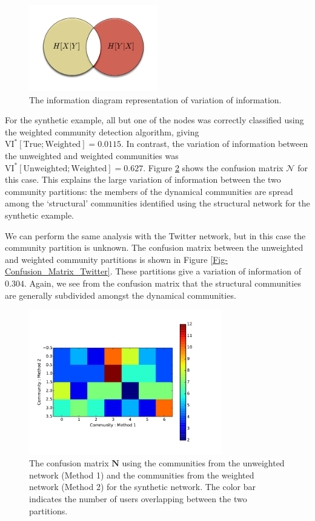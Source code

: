 \documentclass[12pt]{article}
\begin{document}
\begin{figure}[h!]
  \centering
\includegraphics[width=0.50\textwidth]{Figures/Variation-of-Information.png}
\caption{The information diagram representation of variation of information.}
\label{Fig-Information_Diagram}
\end{figure}

For the synthetic example, all but one of the nodes was correctly classified using the weighted community detection algorithm, giving $\text{VI}^{*}[\text{True}; \text{Weighted}] = 0.0115$. In contrast, the variation of information between the unweighted and weighted communities was $\text{VI}^{*}[\text{Unweighted}; \text{Weighted}] = 0.627$. Figure \ref{Fig-Confusion_Matrix_Synthetic} shows the confusion matrix $\mathcal{N}$ for this case. This explains the large variation of information between the two community partitions: the members of the dynamical communities are spread among the `structural' communities identified using the structural network for the synthetic example.

We can perform the same analysis with the Twitter network, but in this case the community partition is unknown. The confusion matrix between the unweighted and weighted community partitions is shown in Figure \ref{Fig-Confusion_Matrix_Twitter}. These partitions give a variation of information of $0.304$. Again, we see from the confusion matrix that the structural communities are generally subdivided amongst the dynamical communities.

\begin{figure}[h!]
  \centering
\includegraphics[width=0.75\textwidth]{Figures/confusion_matrix-synthetic.pdf}
\caption{The confusion matrix $\mathbf{N}$ using the communities from the unweighted network (Method 1) and the communities from the weighted network (Method 2) for the synthetic network. The color bar indicates the number of users overlapping between the two partitions.}
\label{Fig-Confusion_Matrix_Synthetic}
\end{figure}
\end{document}
